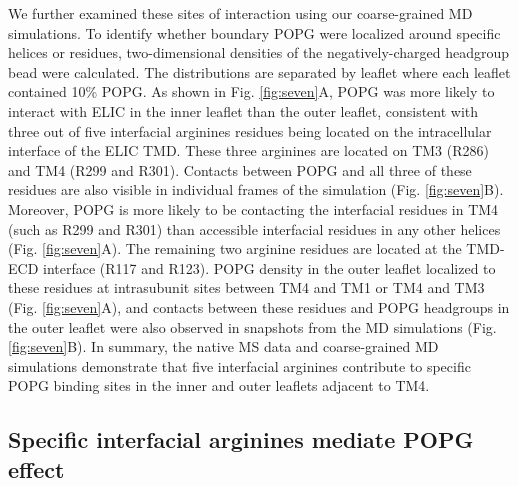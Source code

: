 We further examined these sites of interaction using our coarse-grained
MD simulations. To identify whether boundary POPG were localized around
specific helices or residues, two-dimensional densities of the
negatively-charged headgroup bead were calculated. The distributions are
separated by leaflet where each leaflet contained 10\% POPG. As shown in
Fig. \ref{fig:seven}A, POPG was more likely to interact with ELIC in the inner
leaflet than the outer leaflet, consistent with three out of five
interfacial arginines residues being located on the intracellular
interface of the ELIC TMD. These three arginines are located on TM3
(R286) and TM4 (R299 and R301). Contacts between POPG and all three of
these residues are also visible in individual frames of the simulation
(Fig. \ref{fig:seven}B). Moreover, POPG is more likely to be contacting the
interfacial residues in TM4 (such as R299 and R301) than accessible
interfacial residues in any other helices (Fig. \ref{fig:seven}A). The remaining two
arginine residues are located at the TMD-ECD interface (R117 and R123).
POPG density in the outer leaflet localized to these residues at
intrasubunit sites between TM4 and TM1 or TM4 and TM3 (Fig. \ref{fig:seven}A), and
contacts between these residues and POPG headgroups in the outer leaflet
were also observed in snapshots from the MD simulations (Fig. \ref{fig:seven}B). In
summary, the native MS data and coarse-grained MD simulations
demonstrate that five interfacial arginines contribute to specific POPG
binding sites in the inner and outer leaflets adjacent to TM4.

\subsection{Specific interfacial arginines mediate POPG effect}

